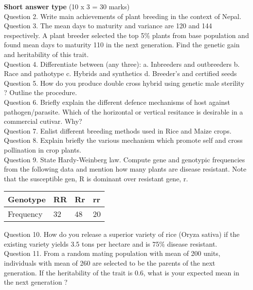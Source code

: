 \documentclass[12pt]{article}\usepackage[]{graphicx}\usepackage[]{color}
\begin{document}
\textbf{Short answer type} (10 x 3 = 30 marks) \\
Question 2. Write main achievements of plant breeding in the context of Nepal.\\
Question 3. The mean days to maturity and variance are 120 and 144 respectively. A plant breeder selected the top 5\% plants from base population and found mean days to maturity 110 in the next generation. Find the genetic gain and heritability of this trait.\\
Question 4. Differentiate between (any three): a. Inbreeders and outbreeders b. Race and pathotype c. Hybrids and synthetics d. Breeder's and certified seeds\\
Question 5. How do you produce double cross hybrid using genetic male sterility ? Outline the procedure.\\
Question 6. Briefly explain the different defence mechanisms of host against pathogen/parasite. Which of the horizontal or vertical resitance is desirable in a commercial cutivar. Why?\\
Question 7. Enlist different breeding methods used in Rice and Maize crops.\\
Question 8. Explain briefly the various mechanism which promote self and cross pollination in crop plants.\\
Question 9. State Hardy-Weinberg law. Compute gene and genotypic frequencies from the following data and mention how many plants are disease resistant. Note that the susceptible gen, R is dominant over resistant gene, r.\\ 
\begin{table}[H]
\centering\begingroup\fontsize{8}{10}\selectfont

\begin{tabular}[t]{llll}
\toprule
Genotype & RR & Rr & rr\\
\midrule
Frequency & 32 & 48 & 20\\
\bottomrule
\end{tabular}
\endgroup{}
\end{table}
Question 10. How do you release a superior variety of rice (Oryza sativa) if the existing variety yields 3.5 tons per hectare and is 75\% disease resistant.\\
Question 11. From a random mating population with mean of 200 units, individuals with mean of 260 are selected to be the parents of the next generation. If the heritability of the trait is 0.6, what is your expected mean in the next generation ?\\
\clearpage 
\end{document}
